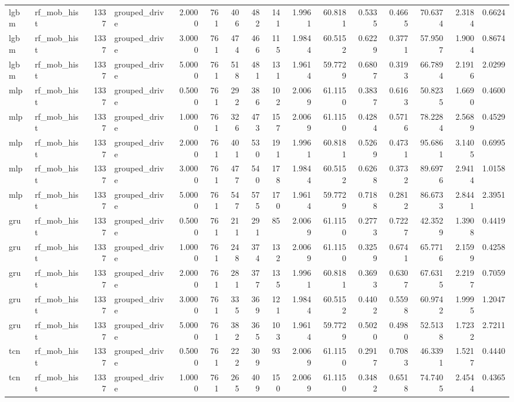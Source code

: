 \begin{tabular}{llrlrrrrrrrrrrrr}
lgbm & rf\_mob\_hist & 1337 & grouped\_drive & 2.0000 & 761 & 406 & 482 & 141 & 1.9961 & 60.8181 & 0.5335 & 0.4665 & 70.6374 & 2.3184 & 0.6624 \\
lgbm & rf\_mob\_hist & 1337 & grouped\_drive & 3.0000 & 761 & 474 & 466 & 115 & 1.9844 & 60.5152 & 0.6229 & 0.3771 & 57.9507 & 1.9004 & 0.8674 \\
lgbm & rf\_mob\_hist & 1337 & grouped\_drive & 5.0000 & 761 & 518 & 481 & 131 & 1.9614 & 59.7729 & 0.6807 & 0.3193 & 66.7894 & 2.1916 & 2.0299 \\
mlp & rf\_mob\_hist & 1337 & grouped\_drive & 0.5000 & 761 & 292 & 386 & 102 & 2.0069 & 61.1150 & 0.3837 & 0.6163 & 50.8235 & 1.6690 & 0.4600 \\
mlp & rf\_mob\_hist & 1337 & grouped\_drive & 1.0000 & 761 & 326 & 473 & 157 & 2.0069 & 61.1150 & 0.4284 & 0.5716 & 78.2284 & 2.5689 & 0.4529 \\
mlp & rf\_mob\_hist & 1337 & grouped\_drive & 2.0000 & 761 & 401 & 530 & 191 & 1.9961 & 60.8181 & 0.5269 & 0.4731 & 95.6861 & 3.1405 & 0.6995 \\
mlp & rf\_mob\_hist & 1337 & grouped\_drive & 3.0000 & 761 & 477 & 540 & 178 & 1.9844 & 60.5152 & 0.6268 & 0.3732 & 89.6976 & 2.9414 & 1.0158 \\
mlp & rf\_mob\_hist & 1337 & grouped\_drive & 5.0000 & 761 & 547 & 575 & 170 & 1.9614 & 59.7729 & 0.7188 & 0.2812 & 86.6733 & 2.8441 & 2.3951 \\
gru & rf\_mob\_hist & 1337 & grouped\_drive & 0.5000 & 761 & 211 & 291 & 85 & 2.0069 & 61.1150 & 0.2773 & 0.7227 & 42.3529 & 1.3908 & 0.4419 \\
gru & rf\_mob\_hist & 1337 & grouped\_drive & 1.0000 & 761 & 248 & 374 & 132 & 2.0069 & 61.1150 & 0.3259 & 0.6741 & 65.7716 & 2.1599 & 0.4258 \\
gru & rf\_mob\_hist & 1337 & grouped\_drive & 2.0000 & 761 & 281 & 377 & 135 & 1.9961 & 60.8181 & 0.3693 & 0.6307 & 67.6315 & 2.2197 & 0.7059 \\
gru & rf\_mob\_hist & 1337 & grouped\_drive & 3.0000 & 761 & 335 & 369 & 121 & 1.9844 & 60.5152 & 0.4402 & 0.5598 & 60.9742 & 1.9995 & 1.2047 \\
gru & rf\_mob\_hist & 1337 & grouped\_drive & 5.0000 & 761 & 382 & 365 & 103 & 1.9614 & 59.7729 & 0.5020 & 0.4980 & 52.5138 & 1.7232 & 2.7211 \\
tcn & rf\_mob\_hist & 1337 & grouped\_drive & 0.5000 & 761 & 222 & 309 & 93 & 2.0069 & 61.1150 & 0.2917 & 0.7083 & 46.3391 & 1.5217 & 0.4440 \\
tcn & rf\_mob\_hist & 1337 & grouped\_drive & 1.0000 & 761 & 265 & 409 & 150 & 2.0069 & 61.1150 & 0.3482 & 0.6518 & 74.7405 & 2.4544 & 0.4365 \\

\end{tabular}
